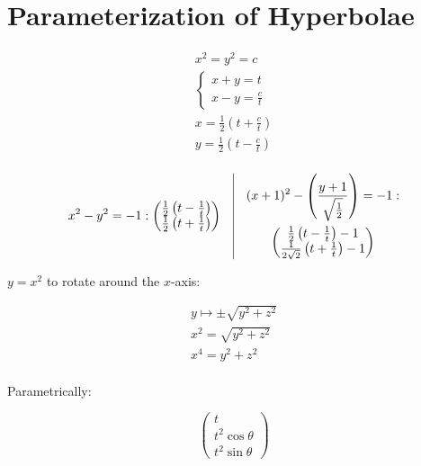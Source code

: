 \documentclass[00_complete]{subfiles}
\begin{document}
\section{Parameterization of Hyperbolae}
$$
\begin{gathered}
    x^2=y^2= c \\
    \begin{cases}
        x+y = t \\
        x-y = \frac{c}{t}
    \end{cases} \\
    x=\frac{1}{2}\left(t+\frac{c}{t}\right) \\
    y=\frac{1}{2}\left(t-\frac{c}{t}\right) \\
\end{gathered}
$$

$$\begin{gathered}
    x^2-y^2=-1:
    \begin{pmatrix}
        \frac{1}{2}\left(t-\frac{1}{t}\right) \\
        \frac{1}{2}\left(t+\frac{1}{t}\right) \\
    \end{pmatrix}
\end{gathered} \quad \vline \quad
\begin{gathered}
    (x+1)^2-\left(\frac{y+1}{\sqrt{\frac{1}{2}}}\right)=-1: \\
    \begin{pmatrix}
        \frac{1}{2}\left(t-\frac{1}{t}\right)-1 \\
        \frac{1}{2\sqrt 2}\left(t+\frac{1}{t}\right)-1 \\
    \end{pmatrix}
\end{gathered}$$

$y=x^2$ to rotate around the $x$-axis:

$$
\begin{gathered}
    y \mapsto \pm \sqrt{y^2+z^2} \\
    x^2 = \sqrt{y^2+z^2} \\
    x^4 = y^2+z^2 \\
\end{gathered}
$$

Parametrically:

$$\begin{pmatrix}
    t \\ t^2 \cos \theta \\ t^2 \sin \theta
\end{pmatrix}$$
\end{document}
